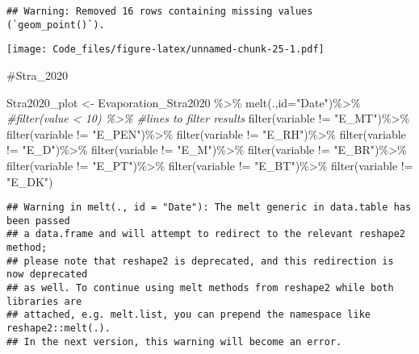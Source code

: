 \documentclass[
]{article}
\newenvironment{Shaded}{\begin{snugshade}}{\end{snugshade}}
\newcommand{\AttributeTok}[1]{\textcolor[rgb]{0.77,0.63,0.00}{#1}}
\newcommand{\CommentTok}[1]{\textcolor[rgb]{0.56,0.35,0.01}{\textit{#1}}}
\newcommand{\FunctionTok}[1]{\textcolor[rgb]{0.00,0.00,0.00}{#1}}
\newcommand{\NormalTok}[1]{#1}
\newcommand{\OtherTok}[1]{\textcolor[rgb]{0.56,0.35,0.01}{#1}}
\newcommand{\SpecialCharTok}[1]{\textcolor[rgb]{0.00,0.00,0.00}{#1}}
\newcommand{\StringTok}[1]{\textcolor[rgb]{0.31,0.60,0.02}{#1}}
\begin{document}
\begin{verbatim}
## Warning: Removed 16 rows containing missing values (`geom_point()`).
\end{verbatim}

\texttt{[image: Code\_files/figure-latex/unnamed-chunk-25-1.pdf]}

\#Stra\_2020

\begin{Shaded}
\begin{Highlighting}[]
\NormalTok{Stra2020\_plot }\OtherTok{\textless{}{-}}\NormalTok{ Evaporation\_Stra2020 }\SpecialCharTok{\%\textgreater{}\%} 
 \FunctionTok{melt}\NormalTok{(.,}\AttributeTok{id=}\StringTok{"Date"}\NormalTok{)}\SpecialCharTok{\%\textgreater{}\%} 
   \CommentTok{\#filter(value \textless{} 10) \%\textgreater{}\%               \#lines to filter results}
  \FunctionTok{filter}\NormalTok{(variable }\SpecialCharTok{!=} \StringTok{"E\_MT"}\NormalTok{)}\SpecialCharTok{\%\textgreater{}\%}
  \FunctionTok{filter}\NormalTok{(variable }\SpecialCharTok{!=} \StringTok{"E\_PEN"}\NormalTok{)}\SpecialCharTok{\%\textgreater{}\%}
  \FunctionTok{filter}\NormalTok{(variable }\SpecialCharTok{!=} \StringTok{"E\_RH"}\NormalTok{)}\SpecialCharTok{\%\textgreater{}\%}
  \FunctionTok{filter}\NormalTok{(variable }\SpecialCharTok{!=} \StringTok{"E\_D"}\NormalTok{)}\SpecialCharTok{\%\textgreater{}\%}
  \FunctionTok{filter}\NormalTok{(variable }\SpecialCharTok{!=} \StringTok{"E\_M"}\NormalTok{)}\SpecialCharTok{\%\textgreater{}\%}
  \FunctionTok{filter}\NormalTok{(variable }\SpecialCharTok{!=} \StringTok{"E\_BR"}\NormalTok{)}\SpecialCharTok{\%\textgreater{}\%}
  \FunctionTok{filter}\NormalTok{(variable }\SpecialCharTok{!=} \StringTok{"E\_PT"}\NormalTok{)}\SpecialCharTok{\%\textgreater{}\%}
  \FunctionTok{filter}\NormalTok{(variable }\SpecialCharTok{!=} \StringTok{"E\_BT"}\NormalTok{)}\SpecialCharTok{\%\textgreater{}\%}
  \FunctionTok{filter}\NormalTok{(variable }\SpecialCharTok{!=} \StringTok{"E\_DK"}\NormalTok{)}
\end{Highlighting}
\end{Shaded}

\begin{verbatim}
## Warning in melt(., id = "Date"): The melt generic in data.table has been passed
## a data.frame and will attempt to redirect to the relevant reshape2 method;
## please note that reshape2 is deprecated, and this redirection is now deprecated
## as well. To continue using melt methods from reshape2 while both libraries are
## attached, e.g. melt.list, you can prepend the namespace like reshape2::melt(.).
## In the next version, this warning will become an error.
\end{verbatim}
\end{document}
